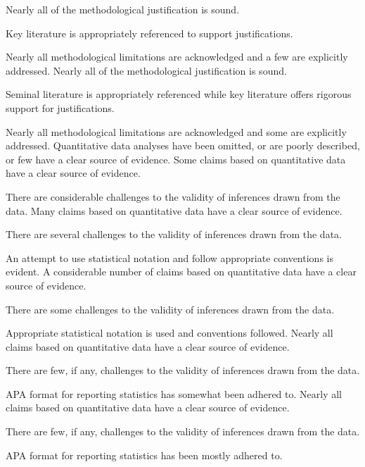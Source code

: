 \documentclass{../../fal_assignment}
\begin{document}
\begin{markingrubric}
        \grade 		Nearly all  of the methodological justification is sound.
        \par		Key literature is appropriately referenced to support justifications.
        \par 		Nearly all methodological limitations are acknowledged and a few are explicitly addressed.
        \grade 		Nearly all  of the methodological justification is sound.
        \par		Seminal literature is appropriately referenced while key literature offers rigorous support for justifications.
        \par		Nearly all methodological limitations are acknowledged and some are explicitly addressed.
%
        \grade\fail 	Quantitative data analyses have been omitted, or are poorly described, or few have a clear source of evidence.
        \grade		Some claims based on quantitative data have a clear source of evidence.
	\par 		There are considerable challenges to the validity of inferences drawn from the data.
        \grade		Many claims based on quantitative data have a clear source of evidence.
        \par 		There are several challenges to the validity of inferences drawn from the data.
	\par 		An attempt to use statistical notation and follow appropriate conventions is evident.
        \grade		A considerable number of claims based on quantitative data have a clear source of evidence.
        \par		There are some challenges to the validity of inferences drawn from the data.
        \par 		Appropriate statistical notation is used and conventions followed.
        \grade		Nearly all claims based on quantitative data have a clear source of evidence.
        \par		There are few, if any, challenges to the validity of inferences drawn from the data.
        \par 		APA format for reporting statistics has somewhat been adhered to.
        \grade		Nearly all claims based on quantitative data have a clear source of evidence.
        \par		There are few, if any, challenges to the validity of inferences drawn from the data.
        \par 		APA format for reporting statistics has been mostly adhered to.

\end{markingrubric}
\end{document}
